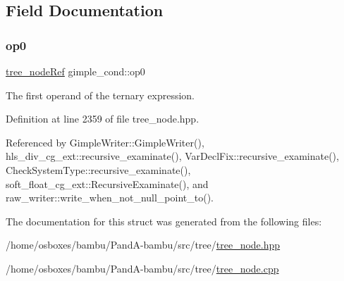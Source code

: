 \subsection{Field Documentation}
\mbox{\label{structgimple__cond_af285b7f9dc9765f7444ac88a286062b6}} 
\subsubsection{\texorpdfstring{op0}{op0}}
{\footnotesize\ttfamily \hyperlink{tree__node_8hpp_a6ee377554d1c4871ad66a337eaa67fd5}{tree\+\_\+node\+Ref} gimple\+\_\+cond\+::op0}



The first operand of the ternary expression. 



Definition at line 2359 of file tree\+\_\+node.\+hpp.



Referenced by Gimple\+Writer\+::\+Gimple\+Writer(), hls\+\_\+div\+\_\+cg\+\_\+ext\+::recursive\+\_\+examinate(), Var\+Decl\+Fix\+::recursive\+\_\+examinate(), Check\+System\+Type\+::recursive\+\_\+examinate(), soft\+\_\+float\+\_\+cg\+\_\+ext\+::\+Recursive\+Examinate(), and raw\+\_\+writer\+::write\+\_\+when\+\_\+not\+\_\+null\+\_\+point\+\_\+to().



The documentation for this struct was generated from the following files\+:\begin{DoxyCompactItemize}
\item 
/home/osboxes/bambu/\+Pand\+A-\/bambu/src/tree/\hyperlink{tree__node_8hpp}{tree\+\_\+node.\+hpp}\item 
/home/osboxes/bambu/\+Pand\+A-\/bambu/src/tree/\hyperlink{tree__node_8cpp}{tree\+\_\+node.\+cpp}\end{DoxyCompactItemize}
